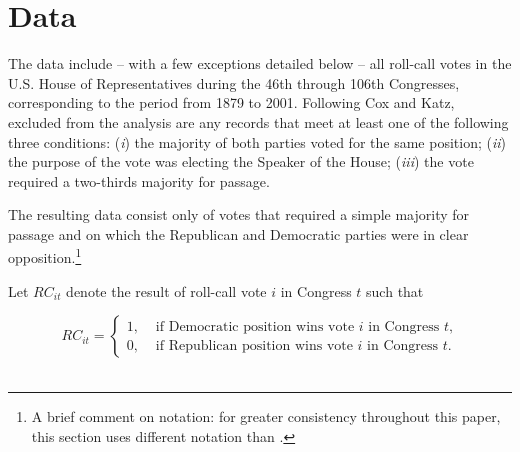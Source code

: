 \section{Data}
\label{ckdata}

The data include -- with a few exceptions detailed below -- all roll-call votes in the U.S. House of Representatives during the 46th through 106th Congresses, corresponding to the period from 1879 to 2001.  Following Cox and Katz, excluded from the analysis are any records that meet at least one of the following three conditions: ({\it i}) the majority of both parties voted for the same position; ({\it ii}) the purpose of the vote was electing the Speaker of the House; ({\it iii}) the vote required a two-thirds majority for passage.

The resulting data consist only of votes that required a simple majority for passage and on which the Republican and Democratic parties were in clear opposition.\footnote{A brief comment on notation: for greater consistency throughout this paper, this section uses different notation than .}

Let $RC_{it}$ denote the result of roll-call vote $i$ in Congress $t$ such that 

\begin{equation*}
RC_{it} =
\begin{cases} 
1, & \text{ if Democratic position wins vote $i$ in Congress $t$,} \\[10pt]
0, & \text{ if Republican position wins vote $i$ in Congress $t$.}
\end{cases}
\end{equation*}
~\\[-12pt]


